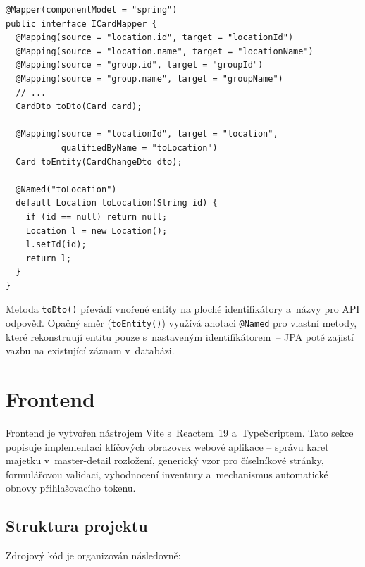 \begin{listing}[H]
\caption{MapStruct mapper pro kartu majetku (zkráceno)}\label{lst:mapper}
\begin{verbatim}
@Mapper(componentModel = "spring")
public interface ICardMapper {
  @Mapping(source = "location.id", target = "locationId")
  @Mapping(source = "location.name", target = "locationName")
  @Mapping(source = "group.id", target = "groupId")
  @Mapping(source = "group.name", target = "groupName")
  // ...
  CardDto toDto(Card card);

  @Mapping(source = "locationId", target = "location",
           qualifiedByName = "toLocation")
  Card toEntity(CardChangeDto dto);

  @Named("toLocation")
  default Location toLocation(String id) {
    if (id == null) return null;
    Location l = new Location();
    l.setId(id);
    return l;
  }
}
\end{verbatim}
\end{listing}

Metoda \texttt{toDto()} převádí vnořené entity na ploché identifikátory a~názvy pro API odpověď. Opačný směr (\texttt{toEntity()}) využívá anotaci \texttt{@Named} pro vlastní metody, které rekonstruují entitu pouze s~nastaveným identifikátorem~-- JPA poté zajistí vazbu na existující záznam v~databázi.

\section{Frontend}

Frontend je vytvořen nástrojem Vite s~Reactem~19 a~TypeScriptem. Tato sekce popisuje implementaci klíčových obrazovek webové aplikace -- správu karet majetku v~master-detail rozložení, generický vzor pro číselníkové stránky, formulářovou validaci, vyhodnocení inventury a~mechanismus automatické obnovy přihlašovacího tokenu.

\subsection{Struktura projektu}

Zdrojový kód je organizován následovně:


